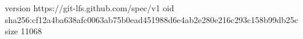 version https://git-lfs.github.com/spec/v1
oid sha256:cf12a4ba638afc0063ab75b0ead451988d6e4ab2e280e216c293c158b99db25c
size 11068
